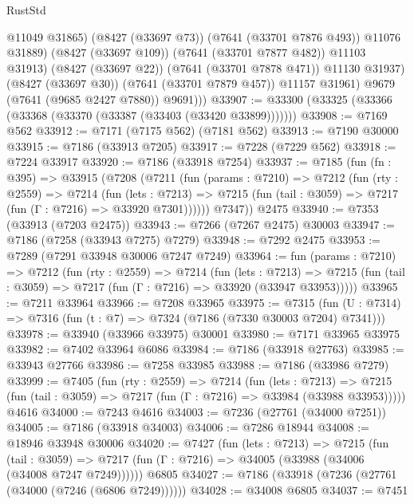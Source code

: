 \begin{lexlean}{RustStd}
\begin{coremodule}
{\begin{coremodule}
{{{{{{{{{{{{{{{{{{{{{{{{{{{{{{{{                    @11049
                    @31865)
                  (@8427 (@33697 @73))
                  (@7641 (@33701 @7876 @493))
                  @11076
                  @31889)
                (@8427 (@33697 @109))
                (@7641 (@33701 @7877 @482))
                @11103
                @31913)
              (@8427 (@33697 @22))
              (@7641 (@33701 @7878 @471))
              @11130
              @31937)
            (@8427 (@33697 @30))
            (@7641 (@33701 @7879 @457))
            @11157
            @31961)
          @9679
          (@7641 (@9685 @2427 @7880))
          @9691)))
@33907 := @33300 (@33325 (@33366 (@33368 (@33370 (@33387 (@33403 (@33420 @33899)))))))
@33908 := @7169 @562
@33912 := @7171 (@7175 @562) (@7181 @562)
@33913 := @7190 @30000
@33915 := @7186 (@33913 @7205)
@33917 := @7228 (@7229 @562)
@33918 := @7224 @33917
@33920 := @7186 (@33918 @7254)
@33937 := @7185
    (fun (fn : @395) =>
    @33915
      (@7208
        (@7211
          (fun (params : @7210) =>
          @7212
            (fun (rty : @2559) =>
            @7214
              (fun (lets : @7213) =>
              @7215 (fun (tail : @3059) => @7217 (fun (Γ : @7216) => @33920 @7301))))))
        @7347))
    @2475
@33940 := @7353 (@33913 (@7203 @2475))
@33943 := @7266 (@7267 @2475) @30003
@33947 := @7186 (@7258 (@33943 @7275) @7279)
@33948 := @7292 @2475
@33953 := @7289 (@7291 @33948 @30006 @7247 @7249)
@33964 := fun (params : @7210) =>
  @7212
    (fun (rty : @2559) =>
    @7214
      (fun (lets : @7213) =>
      @7215 (fun (tail : @3059) => @7217 (fun (Γ : @7216) => @33920 (@33947 @33953)))))
@33965 := @7211 @33964
@33966 := @7208 @33965
@33975 := @7315
    (fun (U : @7314) => @7316 (fun (t : @7) => @7324 (@7186 (@7330 @30003 @7204) @7341)))
@33978 := @33940 (@33966 @33975) @30001
@33980 := @7171 @33965 @33975
@33982 := @7402 @33964 @6086
@33984 := @7186 (@33918 @27763)
@33985 := @33943 @27766
@33986 := @7258 @33985
@33988 := @7186 (@33986 @7279)
@33999 := @7405
    (fun (rty : @2559) =>
    @7214
      (fun (lets : @7213) =>
      @7215 (fun (tail : @3059) => @7217 (fun (Γ : @7216) => @33984 (@33988 @33953)))))
    @4616
@34000 := @7243 @4616
@34003 := @7236 (@27761 (@34000 @7251))
@34005 := @7186 (@33918 @34003)
@34006 := @7286 @18944
@34008 := @18946 @33948 @30006
@34020 := @7427
    (fun (lets : @7213) =>
    @7215
      (fun (tail : @3059) =>
      @7217 (fun (Γ : @7216) => @34005 (@33988 (@34006 (@34008 @7247 @7249))))))
    @6805
@34027 := @7186 (@33918 (@7236 (@27761 (@34000 (@7246 (@6806 @7249))))))
@34028 := @34008 @6805
@34037 := @7451
}}}}}}}}}}}}}}}}}}}}}}}}}}}}}}}}
\end{coremodule}}
\end{coremodule}
\end{lexlean}
